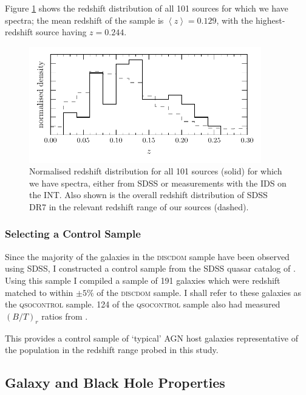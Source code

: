 
Figure \ref{fig:redshifts} shows the redshift distribution of all 101 sources for which we have spectra; the mean redshift of the sample is $\left< z \right> = 0.129$, with the highest-redshift source having $z = 0.244$. 


\begin{figure}
\centering
\includegraphics[width=0.9\textwidth]{agn/z_distribution_101_sdss.pdf}
\caption[Redshift distribution of bulgeless galaxies]{Normalised redshift distribution for all 101 sources (solid) for which we have spectra, either from SDSS or measurements with the IDS on the INT. Also shown is the overall redshift distribution of SDSS DR7 in the relevant redshift range of our sources (dashed).
}
\label{fig:redshifts}
\end{figure}

\subsubsection{Selecting a Control Sample}

Since the majority of the galaxies in the \textsc{discdom} sample have been observed using SDSS, I constructed a control sample from the SDSS quasar catalog of \citet{shen11}. Using this sample I compiled a sample of 191 galaxies which were redshift matched to within $\pm5\%$ of the \textsc{discdom} sample. I shall refer to these galaxies as the \textsc{qsocontrol} sample. 124 of the \textsc{qsocontrol} sample also had measured $(B/T)_r$ ratios from \citet[][matched with a $3''$ search radius, see Section~\ref{sec:galmass}]{simard11}. 

This provides a control sample of `typical' AGN host galaxies representative of the population in the redshift range probed in this study. 

%
%
\subsection{Galaxy and Black Hole Properties}\label{sec:masses}
%
%

